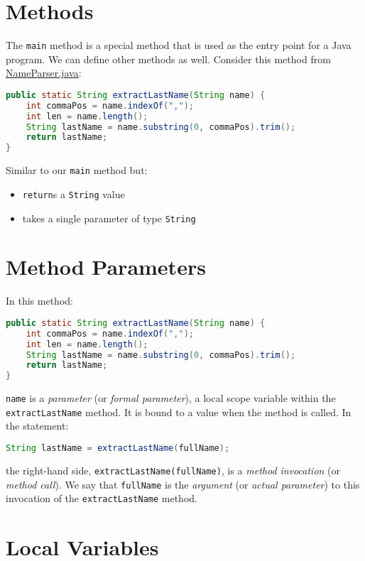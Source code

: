 \documentclass{article}
\begin{document}
\section{Methods}

The {\tt main} method is a special method that is used as the entry point for a Java program.  We can define other methods as well.  Consider this method from \href{\code/basics/NameParser.java}{NameParser.java}:

\begin{lstlisting}[language=Java]
public static String extractLastName(String name) {
    int commaPos = name.indexOf(",");
    int len = name.length();
    String lastName = name.substring(0, commaPos).trim();
    return lastName;
}
\end{lstlisting}
Similar to our {\tt main} method but:
\begin{itemize}
\item {\tt return}s a {\tt String} value
\item takes a single parameter of type {\tt String}
\end{itemize}


\section{Method Parameters}

In this method:
\begin{lstlisting}[language=Java]
public static String extractLastName(String name) {
    int commaPos = name.indexOf(",");
    int len = name.length();
    String lastName = name.substring(0, commaPos).trim();
    return lastName;
}
\end{lstlisting}
{\tt name} is a {\it parameter} (or {\it formal parameter}), a local scope variable within the {\tt extractLastName} method.  It is bound to a value when the method is called.  In the statement:

\begin{lstlisting}[language=Java]
String lastName = extractLastName(fullName);
\end{lstlisting}
the right-hand side, {\tt extractLastName(fullName)}, is a {\it method invocation} (or {\it method call}).  We say that {\tt fullName} is the {\it argument} (or {\it actual parameter}) to this invocation of the {\tt extractLastName} method.


\section{Local Variables}
\end{document}
